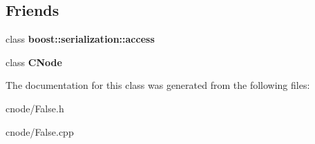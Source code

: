 \subsection*{\-Friends}
\begin{DoxyCompactItemize}
\item 
\hypertarget{classFalse_ac98d07dd8f7b70e16ccb9a01abf56b9c}{class {\bfseries boost\-::serialization\-::access}}\label{classFalse_ac98d07dd8f7b70e16ccb9a01abf56b9c}

\item 
\hypertarget{classFalse_a0657a422d4ddc5f4a0ff56931b7d2767}{class {\bfseries \-C\-Node}}\label{classFalse_a0657a422d4ddc5f4a0ff56931b7d2767}

\end{DoxyCompactItemize}


\-The documentation for this class was generated from the following files\-:\begin{DoxyCompactItemize}
\item 
cnode/\-False.\-h\item 
cnode/\-False.\-cpp\end{DoxyCompactItemize}
